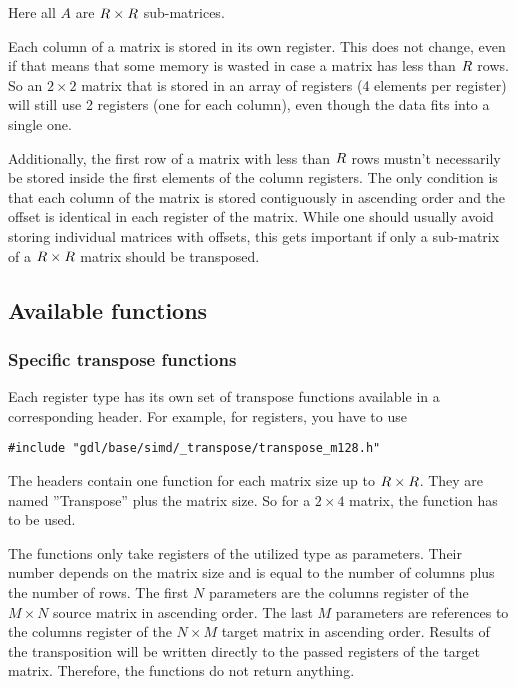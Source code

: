 \noindent Here all $A$ are $R \times R$ sub-matrices.


Each column of a matrix is stored in its own register.
This does not change, even if that means that some memory is wasted in case a matrix has less than $R$ rows.
So an $2 \times 2$ matrix that is stored in an array of  registers (4 elements per register) will still use 2 registers (one for each column), even though the data fits into a single one.

Additionally, the first row of a matrix with less than $R$ rows mustn't necessarily be stored inside the first elements of the column registers. 
The only condition is that each column of the matrix is stored contiguously in ascending order and the offset is identical in each register of the matrix.
While one should usually avoid storing individual matrices with offsets, this gets important if only a sub-matrix of a $R \times R$ matrix should be transposed.
 

\subsection{Available functions}

\subsubsection{Specific transpose functions}

Each register type has its own set of transpose functions available in a corresponding header.
For example, for  registers, you have to use
\begin{verbatim}
#include "gdl/base/simd/_transpose/transpose_m128.h"
\end{verbatim}

The headers contain one function for each matrix size up to $R \times R$.
They are named ''Transpose'' plus the matrix size.
So for a $2 \times 4$ matrix, the function  has to be used.

The functions only take registers of the utilized type as parameters.
Their number depends on the matrix size and is equal to the number of columns plus the number of rows.
The first $N$ parameters are the columns register of the $M \times N$ source matrix in ascending order.
The last $M$ parameters are references to the columns register of the $N \times M$ target matrix in ascending order.
Results of the transposition will be written directly to the passed registers of the target matrix.
Therefore, the functions do not return anything.

